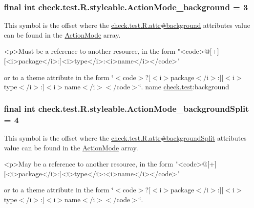 \subsubsection[{Action\+Mode\+\_\+background}]{\setlength{\rightskip}{0pt plus 5cm}final int check.\+test.\+R.\+styleable.\+Action\+Mode\+\_\+background = 3\hspace{0.3cm}{\ttfamily [static]}}\label{classcheck_1_1test_1_1_r_1_1styleable_a2bc48f11c96ca1baa661fbf035348f1b}
This symbol is the offset where the \hyperlink{classcheck_1_1test_1_1_r_1_1attr_a5de53cfcc8516df6498e3a9365fccecb}{check.\+test.\+R.\+attr\#background} attribute\textquotesingle{}s value can be found in the \hyperlink{classcheck_1_1test_1_1_r_1_1styleable_a06d2fd2de1e471a432f3e49eea7b8015}{Action\+Mode} array.

\begin{DoxyVerb}      <p>Must be a reference to another resource, in the form "<code>@[+][<i>package</i>:]<i>type</i>:<i>name</i></code>"
\end{DoxyVerb}
 or to a theme attribute in the form \char`\"{}$<$code$>$?\mbox{[}$<$i$>$package$<$/i$>$\+:\mbox{]}\mbox{[}$<$i$>$type$<$/i$>$\+:\mbox{]}$<$i$>$name$<$/i$>$$<$/code$>$\char`\"{}.  name \hyperlink{namespacecheck_1_1test}{check.\+test}\+:background \hypertarget{classcheck_1_1test_1_1_r_1_1styleable_a34087089909e4f53d9a05b693bbd6717}{}
\subsubsection[{Action\+Mode\+\_\+background\+Split}]{\setlength{\rightskip}{0pt plus 5cm}final int check.\+test.\+R.\+styleable.\+Action\+Mode\+\_\+background\+Split = 4\hspace{0.3cm}{\ttfamily [static]}}\label{classcheck_1_1test_1_1_r_1_1styleable_a34087089909e4f53d9a05b693bbd6717}
This symbol is the offset where the \hyperlink{classcheck_1_1test_1_1_r_1_1attr_ab1f7b7ff195fede33bbdf5e4010cb312}{check.\+test.\+R.\+attr\#background\+Split} attribute\textquotesingle{}s value can be found in the \hyperlink{classcheck_1_1test_1_1_r_1_1styleable_a06d2fd2de1e471a432f3e49eea7b8015}{Action\+Mode} array.

\begin{DoxyVerb}      <p>May be a reference to another resource, in the form "<code>@[+][<i>package</i>:]<i>type</i>:<i>name</i></code>"
\end{DoxyVerb}
 or to a theme attribute in the form \char`\"{}$<$code$>$?\mbox{[}$<$i$>$package$<$/i$>$\+:\mbox{]}\mbox{[}$<$i$>$type$<$/i$>$\+:\mbox{]}$<$i$>$name$<$/i$>$$<$/code$>$\char`\"{}. 

